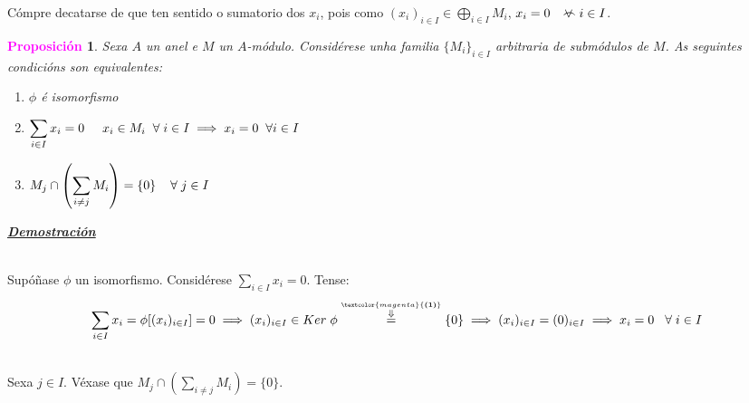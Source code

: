 \documentclass[twoside]{report}
\newcommand{\magbf}[1]{\textcolor{magenta}{\textbf{#1}}} %
\newcommand{\almostall}{\mathrel{\vee\mkern-19mu\frown}} %
\theoremstyle{mystyle}
\newtheorem{prop}{\magbf{Proposición}}[chapter]
\newenvironment{proposition}
{\begin{mdframed}[linecolor = magenta,backgroundcolor = classicrose, linewidth = 2mm]\begin{prop}}
{\end{prop}\end{mdframed}}
\begin{document}
\noindent Cómpre decatarse de que ten sentido o sumatorio dos $x_{i}$, pois como $(x_{i})_{i \in I} \in \displaystyle \bigoplus_{i \in I} M_{i}$, $x_{i} = 0 \hspace{3mm} \almostall i \in I$.\\

\begin{proposition} \label{prop3.11}
Sexa $A$ un anel e $M$ un $A$-módulo. Considérese unha familia $\{M_{i}\}_{i \in I}$ arbitraria de submódulos de $M$. As seguintes condicións son equivalentes:
\begin{enumerate}
    \item $\phi$ é isomorfismo
    \item $\displaystyle \sum_{i \in I} x_{i} = 0 \hspace{5mm} x_{i} \in M_{i} \hspace{2mm} \forall \hspace{1mm} i \in I \implies x_{i} = 0 \hspace{2mm} \forall i \in I$
    \item $M_{j} \cap \left(\displaystyle \sum_{i \neq j} M_{i}\right) = \{0\} \hspace{4mm} \forall \hspace{1mm} j \in I$
\end{enumerate}
\end{proposition}

\vspace{2mm}

\noindent \textbf{\textit{\underline{Demostración}}}

\vspace{2mm}

\noindent {}\\

\noindent Supóñase $\phi$ un isomorfismo. Considérese $\displaystyle \sum_{i \in I} x_{i} = 0$. Tense:
$$\displaystyle \sum_{i \in I} x_{i} = \phi[(x_{i})_{i \in I}] = 0 \implies (x_{i})_{i \in I} \in Ker \hspace{1mm} \phi \overset{\overset{\magbf{(1)}}{\Downarrow}}{=} \{0\} \implies (x_{i})_{i \in I} = (0)_{i \in I} \implies x_{i} = 0 \hspace{3mm} \forall \hspace{1mm} i \in I$$

\noindent {}\\

\noindent Sexa $j \in I$. Véxase que $M_{j} \cap \left(\displaystyle \sum_{i \neq j} M_{i}\right) = \{0\}$.\\
\end{document}
